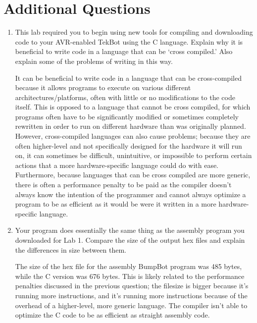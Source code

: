 \documentclass[12pt,letterpaper]{article}
\begin{document}
\section{Additional Questions}
\begin{enumerate}

    \item This lab required you to begin using new tools for compiling and
        downloading code to your AVR-enabled TekBot using the C language.
        Explain why it is beneficial to write code in a language that can be
        ‘cross compiled.’ Also explain some of the problems of writing in this
        way.

        It can be beneficial to write code in a language that can be
        cross-compiled because it allows programs to execute on various
        different architectures/platforms, often with little or no
        modifications to the code itself.  This is opposed to a language that
        cannot be cross compiled, for which programs often have to be
        significantly modified or sometimes completely rewritten in order to
        run on different hardware than was originally planned.  However,
        cross-compiled languages can also cause problems; because they are
        often higher-level and not specifically designed for the hardware it
        will run on, it can sometimes be difficult, unintuitive, or impossible
        to perform certain actions that a more hardware-specific language could
        do with ease.  Furthermore, because languages that can be cross
        compiled are more generic, there is often a performance penalty to be
        paid as the compiler doesn't always know the intention of the
        programmer and cannot always optimize a program to be as efficient as
        it would be were it written in a more hardware-specific language.

    \item Your program does essentially the same thing as the assembly program
        you downloaded for Lab 1. Compare the size of the output hex files and
        explain the differences in size between them.

        The size of the hex file for the assembly BumpBot program was 485
        bytes, while the C version was 676 bytes.  This is likely related to
        the performance penalties discussed in the previous question; the
        filesize is bigger because it's running more instructions, and it's
        running more instructions because of the overhead of a higher-level,
        more generic language.  The compiler isn't able to optimize the C code
        to be as efficient as straight assembly code.

\end{enumerate}
\end{document}
